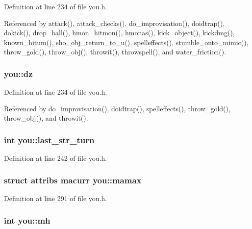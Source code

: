 Definition at line 234 of file you.\+h.



Referenced by attack(), attack\+\_\+checks(), do\+\_\+improvisation(), doidtrap(), dokick(), drop\+\_\+ball(), hmon\+\_\+hitmon(), hmonas(), kick\+\_\+object(), kickdmg(), known\+\_\+hitum(), sho\+\_\+obj\+\_\+return\+\_\+to\+\_\+u(), spelleffects(), stumble\+\_\+onto\+\_\+mimic(), throw\+\_\+gold(), throw\+\_\+obj(), throwit(), throwspell(), and water\+\_\+friction().

\hypertarget{structyou_a3fa7dbf98dab7ca2c40195268174c45f}{
\subsubsection[{dz}]{ you\+::dz}}\label{structyou_a3fa7dbf98dab7ca2c40195268174c45f}


Definition at line 234 of file you.\+h.



Referenced by do\+\_\+improvisation(), doidtrap(), spelleffects(), throw\+\_\+gold(), throw\+\_\+obj(), and throwit().

\hypertarget{structyou_ac3f0aa62ba06486db16c5ae6dc1b3753}{
\subsubsection[{last\+\_\+str\+\_\+turn}]{\setlength{\rightskip}{0pt plus 5cm}int you\+::last\+\_\+str\+\_\+turn}}\label{structyou_ac3f0aa62ba06486db16c5ae6dc1b3753}


Definition at line 242 of file you.\+h.

\hypertarget{structyou_ae54130d24fb395ade866281e8cb6c8d3}{
\subsubsection[{mamax}]{\setlength{\rightskip}{0pt plus 5cm}struct {\bf attribs} macurr you\+::mamax}}\label{structyou_ae54130d24fb395ade866281e8cb6c8d3}


Definition at line 291 of file you.\+h.

\hypertarget{structyou_a2106fda1b357aa3395703a3abff426f8}{
\subsubsection[{mh}]{\setlength{\rightskip}{0pt plus 5cm}int you\+::mh}}\label{structyou_a2106fda1b357aa3395703a3abff426f8}



